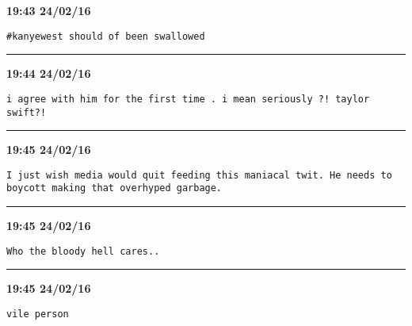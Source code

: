 \begin{adjustwidth}{0cm}{0cm}
\footnotesize \textbf{19:43 24/02/16}

\begin{lstlisting}[breaklines, breakatwhitespace, basicstyle=\small, frame=leftline]
#kanyewest should of been swallowed
\end{lstlisting}
\end{adjustwidth}

\hrule%

\begin{adjustwidth}{0cm}{0cm}
\footnotesize \textbf{19:44 24/02/16}

\begin{lstlisting}[breaklines, breakatwhitespace, basicstyle=\small, frame=leftline]
i agree with him for the first time . i mean seriously ?! taylor swift?!
\end{lstlisting}
\end{adjustwidth}

\hrule%

\begin{adjustwidth}{0cm}{0cm}
\footnotesize \textbf{19:45 24/02/16}

\begin{lstlisting}[breaklines, breakatwhitespace, basicstyle=\small, frame=leftline]
I just wish media would quit feeding this maniacal twit. He needs to boycott making that overhyped garbage.
\end{lstlisting}
\end{adjustwidth}

\hrule%

\begin{adjustwidth}{0cm}{0cm}
\footnotesize \textbf{19:45 24/02/16}

\begin{lstlisting}[breaklines, breakatwhitespace, basicstyle=\small, frame=leftline]
Who the bloody hell cares..
\end{lstlisting}
\end{adjustwidth}

\hrule%

\begin{adjustwidth}{0cm}{0cm}
\footnotesize \textbf{19:45 24/02/16}

\begin{lstlisting}[breaklines, breakatwhitespace, basicstyle=\small, frame=leftline]
vile person
\end{lstlisting}
\end{adjustwidth}

